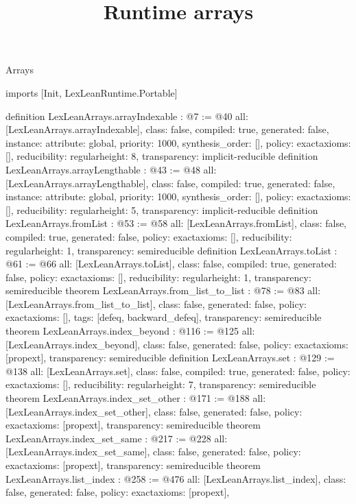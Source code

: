 \begin{lexlean}{Arrays}
\title{Runtime arrays}
\begin{coremodule}
imports [Init, LexLeanRuntime.Portable]

definition LexLeanArrays.arrayIndexable : @7 := @40 {
  all: [LexLeanArrays.arrayIndexable],
  class: false,
  compiled: true,
  generated: false,
  instance: {attribute: global, priority: 1000, synthesis_order: []},
  policy: exact{axioms: []},
  reducibility: regular{height: 8},
  transparency: implicit-reducible
}
definition LexLeanArrays.arrayLengthable : @43 := @48 {
  all: [LexLeanArrays.arrayLengthable],
  class: false,
  compiled: true,
  generated: false,
  instance: {attribute: global, priority: 1000, synthesis_order: []},
  policy: exact{axioms: []},
  reducibility: regular{height: 5},
  transparency: implicit-reducible
}
definition LexLeanArrays.fromList : @53 := @58 {
  all: [LexLeanArrays.fromList],
  class: false,
  compiled: true,
  generated: false,
  policy: exact{axioms: []},
  reducibility: regular{height: 1},
  transparency: semireducible
}
definition LexLeanArrays.toList : @61 := @66 {
  all: [LexLeanArrays.toList],
  class: false,
  compiled: true,
  generated: false,
  policy: exact{axioms: []},
  reducibility: regular{height: 1},
  transparency: semireducible
}
theorem LexLeanArrays.from_list_to_list : @78 := @83 {
  all: [LexLeanArrays.from_list_to_list],
  class: false,
  generated: false,
  policy: exact{axioms: []},
  tags: [defeq, backward_defeq],
  transparency: semireducible
}
theorem LexLeanArrays.index_beyond : @116 := @125 {
  all: [LexLeanArrays.index_beyond],
  class: false,
  generated: false,
  policy: exact{axioms: [propext]},
  transparency: semireducible
}
definition LexLeanArrays.set : @129 := @138 {
  all: [LexLeanArrays.set],
  class: false,
  compiled: true,
  generated: false,
  policy: exact{axioms: []},
  reducibility: regular{height: 7},
  transparency: semireducible
}
theorem LexLeanArrays.index_set_other : @171 := @188 {
  all: [LexLeanArrays.index_set_other],
  class: false,
  generated: false,
  policy: exact{axioms: [propext]},
  transparency: semireducible
}
theorem LexLeanArrays.index_set_same : @217 := @228 {
  all: [LexLeanArrays.index_set_same],
  class: false,
  generated: false,
  policy: exact{axioms: [propext]},
  transparency: semireducible
}
theorem LexLeanArrays.list_index : @258 := @476 {
  all: [LexLeanArrays.list_index],
  class: false,
  generated: false,
  policy: exact{axioms: [propext]},
}
\end{coremodule}
\end{lexlean}
